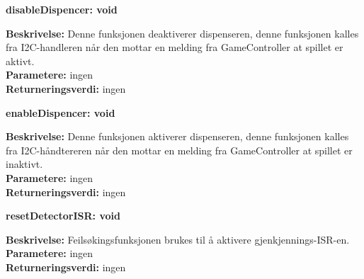 \textbf {disableDispencer: void}
\begin{adjustwidth}{1cm}{0pt}
\textbf {Beskrivelse:} Denne funksjonen deaktiverer dispenseren, denne funksjonen kalles fra I2C-handleren når den mottar en melding fra GameController at spillet er aktivt. \\ [0.2cm]
\textbf {Parametere:} ingen \\ [0.2cm]
\textbf {Returneringsverdi:} ingen \\ [0.2cm]
\end{adjustwidth}

\textbf {enableDispencer: void}
\begin{adjustwidth}{1cm}{0pt}
\textbf {Beskrivelse:} Denne funksjonen aktiverer dispenseren, denne funksjonen kalles fra I2C-håndtereren når den mottar en melding fra GameController at spillet er inaktivt. \\ [0.2cm]
\textbf {Parametere:} ingen \\ [0.2cm]
\textbf {Returneringsverdi:} ingen \\ [0.2cm]
\end{adjustwidth}

\textbf {resetDetectorISR: void}
\begin{adjustwidth}{1cm}{0pt}
\textbf {Beskrivelse:} Feilsøkingsfunksjonen brukes til å aktivere gjenkjennings-ISR-en. \\ [0.2cm]
\textbf {Parametere:} ingen \\ [0.2cm]
\textbf {Returneringsverdi:} ingen \\ [0.2cm]
\end{adjustwidth}